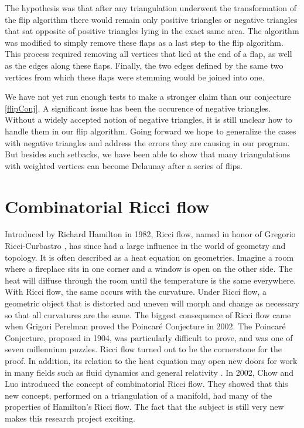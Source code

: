 \documentclass[12pt]{article}
\begin{document}
The hypothesis was that after any triangulation underwent the transformation of the flip algorithm there would remain only positive triangles or negative triangles that sat opposite of positive triangles lying in the exact same area. The algorithm was modified to simply remove these flaps as a last step to the flip algorithm. This process required removing all vertices that lied at the end of a flap, as well as the edges along these flaps. Finally, the two edges defined by the same two vertices from which these flaps were stemming would be joined into one.

We have not yet run enough tests to make a stronger claim than our conjecture \ref{flipConj}. A significant issue has been the occurence of negative triangles. Without a widely accepted notion of negative triangles, it is still unclear how to handle them in our flip algorithm. Going forward we hope to generalize the cases with negative triangles and address the errors they are causing in our program. But besides such setbacks, we have been able to show that many triangulations with weighted vertices can become Delaunay after a series of flips. 

\section{Combinatorial Ricci flow}
\label{RBk}

Introduced by Richard Hamilton in 1982, Ricci flow, named in honor of Gregorio Ricci-Curbastro \cite{RicciBkgd}, has since had a large influence in the world of geometry and topology. It is often described as a heat equation on geometries. Imagine a room where a fireplace sits in one corner and a window is open on the other side. The heat will diffuse through the room until the temperature is the same everywhere. With Ricci flow, the same occurs with the curvature. Under Ricci flow, a geometric object that is distorted and uneven will morph and change as necessary so that all curvatures are the same. The biggest consequence of Ricci flow came when Grigori Perelman proved the Poincar\'{e} Conjecture in 2002. The Poincar\'{e} Conjecture, proposed in 1904, was particularly difficult to prove, and was one of seven millennium puzzles. Ricci flow turned out to be the cornerstone for the proof. In addition, its relation to the heat equation may open new doors for work in many fields
  such as fluid dynamics and general relativity \cite{RicciBkgd}. In 2002, Chow and Luo introduced the concept of combinatorial Ricci flow. They showed that this new concept, performed on a triangulation of a manifold, had many of the properties of Hamilton's Ricci flow. The fact that the subject is still very new makes this research project exciting. 
\end{document}

